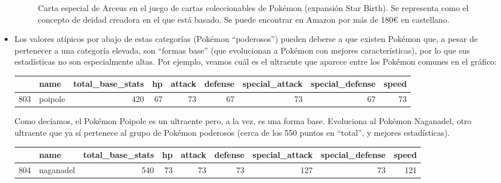 \documentclass[
  11.8pt,
]{extreport}
\begin{document}
\begin{itemize}
\begin{figure}[H]
{  }

  \caption{Carta especial de Arceus en el juego de cartas coleccionables
  de Pokémon (expansión Star Birth). Se representa como el concepto de
  deidad creadora en el que está basado. Se puede encontrar en Amazon
  por más de 180€ en castellano.}

  \end{figure}%
\item
  Los valores atípicos por abajo de estas categorías (Pokémon
  ``poderosos'') pueden deberse a que existen Pokémon que, a pesar de
  pertenecer a una categoría elevada, son ``formas base'' (que
  evolucionan a Pokémon con mejores características), por lo que sus
  estadísticas no son especialmente altas. Por ejemplo, veamos cuál es
  el ultraente que aparece entre los Pokémon comunes en el gráfico:

  \begin{table}[H]
  \centering\begingroup\fontsize{9.5}{11.5}\selectfont

  \begin{tabular}{llrrrrrrr}
  \toprule
    & name & total\_base\_stats & hp & attack & defense & special\_attack & special\_defense & speed\\
  \midrule
  803 & poipole & 420 & 67 & 73 & 67 & 73 & 67 & 73\\
  \bottomrule
  \end{tabular}
  \endgroup{}
  \end{table}

  Como decíamos, el Pokémon Poipole es un ultraente pero, a la vez, es
  una forma base. Evoluciona al Pokémon Naganadel, otro ultraente que ya
  sí pertenece al grupo de Pokémon poderosos (cerca de los 550 puntos en
  ``total'', y mejores estadísticas).

  \begin{table}[H]
  \centering\begingroup\fontsize{9.5}{11.5}\selectfont

  \begin{tabular}{llrrrrrrr}
  \toprule
    & name & total\_base\_stats & hp & attack & defense & special\_attack & special\_defense & speed\\
  \midrule
  804 & naganadel & 540 & 73 & 73 & 73 & 127 & 73 & 121\\
  \bottomrule
  \end{tabular}
  \endgroup{}
  \end{table}

  \begin{figure}[H]


\end{figure}
\end{itemize}
\end{document}
